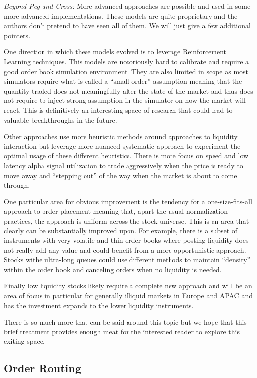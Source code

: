 \noindent\emph{Beyond Peg and Cross:} More advanced approaches are possible and used in some more advanced implementations. These models are quite proprietary and the authors don't pretend to have seen all of them. We will just give a few additional pointers.


One direction in which these models evolved is to leverage Reinforcement Learning techniques. This models are notoriously hard to calibrate and require a good order book simulation environment. They are also limited in scope as most simulators require what is called a ``small order'' assumption meaning that the quantity traded does not meaningfully alter the state of the market and thus does not require to inject strong assumption in the simulator on how the market will react. This is definitively an interesting space of research that could lead to valuable breakthroughs in the future.


Other approaches use more heuristic methods around approaches to liquidity interaction but leverage more nuanced systematic approach to experiment the optimal usage of these different heuristics. There is more focus on speed and low latency alpha  signal utilization to trade aggressively when the price is ready to move away and ``stepping out'' of the way when the market is about to come through.


One particular area for obvious improvement is the tendency for a one-size-fits-all approach to order placement meaning that, apart the usual normalization practices, the approach is uniform across the stock universe. This is an area that clearly can be substantially improved upon. For example, there is a subset of instruments with very volatile and thin order books where posting liquidity does not really add any value and could benefit from a more opportunistic approach. Stocks withe ultra-long queues could use different methods to maintain ``density'' within the order book and canceling orders when no liquidity is needed.


Finally low liquidity stocks likely require a complete new approach and will be an area of focus in particular for generally illiquid markets in Europe and APAC and has the investment expands to the lower liquidity instruments.


There is so much more that can be said around this topic but we hope that this brief treatment provides enough meat for the interested reader to explore this exiting space.



\subsection{Order Routing}

